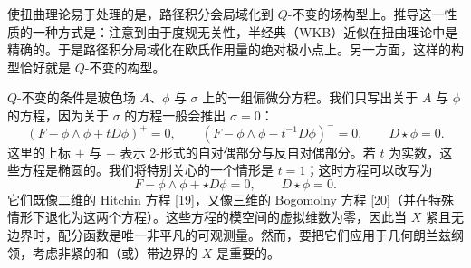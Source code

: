 \documentclass[11pt,a4paper,UTF8]{ctexart}
\begin{document}
使扭曲理论易于处理的是，路径积分会局域化到 $Q$-不变的场构型上。推导这一性质的一种方式是：注意到由于度规无关性，半经典（WKB）近似在扭曲理论中是精确的。于是路径积分局域化在欧氏作用量的绝对极小点上。另一方面，这样的构型恰好就是 $Q$-不变的构型。

$Q$-不变的条件是玻色场 $A$、$\phi$ 与 $\sigma$ 上的一组偏微分方程。我们只写出关于 $A$ 与 $\phi$ 的方程，因为关于 $\sigma$ 的方程一般会推出 $\sigma=0$：
\begin{equation}
    (F-\phi\wedge\phi+tD\phi)^{+}=0,\qquad
    (F-\phi\wedge\phi-t^{-1}D\phi)^{-}=0,\qquad
    D\star\phi=0. \tag{5}
\end{equation}
这里的上标 $+$ 与 $-$ 表示 2-形式的自对偶部分与反自对偶部分。若 $t$ 为实数，这些方程是椭圆的。我们将特别关心的一个情形是 $t=1$；这时方程可以改写为
\[
    F-\phi\wedge\phi+\star D\phi=0,\qquad D\star\phi=0.
\]
它们既像二维的 Hitchin 方程 [19]，又像三维的 Bogomolny 方程 [20]（并在特殊情形下退化为这两个方程）。这些方程的模空间的虚拟维数为零，因此当 $X$ 紧且无边界时，配分函数是唯一非平凡的可观测量。然而，要把它们应用于几何朗兰兹纲领，考虑非紧的和（或）带边界的 $X$ 是重要的。
\end{document}
